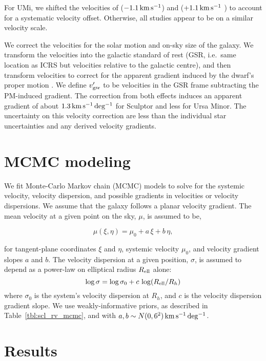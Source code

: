 For UMi, we shifted the velocities of \citet{spencer+2018}
(\(-1.1\,{\rm km\,s^{-1}}\)) and \citet{pace+2020} (\(+1.1\,{\rm km\,s^{-1}}\) ) to account for
a systematic velocity offset. Otherwise, all studies appear to be on a
similar velocity scale.

We correct the velocities for the solar motion and on-sky size of the
galaxy. We transform the velocities into the galactic standard of rest
(GSR, i.e.~same location as ICRS but velocities relative to the galactic
centre), and then transform velocities to correct for the apparent
gradient induced by the dwarf's proper motion \citep[see
also][]{WMO2008, strigari2010}. We define \(v_{\rm gsr}'\) to be
velocities in the GSR frame subtracting the PM-induced gradient. The
correction from both effects induces an apparent gradient of about
\(1.3\,{\rm km\,s^{-1}\,deg^{-1}}\) for Sculptor and less for Ursa Minor. The uncertainty
on this velocity correction are less than the individual star
uncertainties and any derived velocity gradients.

\section{MCMC modeling}\label{mcmc-modeling}

We fit Monte-Carlo Markov chain (MCMC) models to solve for the systemic
velocity, velocity dispersion, and possible gradients in velocities or
velocity dispersions. We assume that the galaxy follows a planar
velocity gradient. The mean velocity at a given point on the sky,
\(\mu\), is assumed to be,

\begin{equation}{
\mu(\xi, \eta) = \mu_0 + a\,\xi + b\,\eta,
}\end{equation}

for tangent-plane coordinates \(\xi\) and \(\eta\), systemic velocity
\(\mu_0\), and velocity gradient slopes \(a\) and \(b\). The velocity
dispersion at a given position, \(\sigma\), is assumed to depend as a
power-law on elliptical radius \(R_{\rm ell}\) alone: \begin{equation}{
\log \sigma = \log \sigma_0 + c\,\log(R_{\rm ell} / R_h)
}\end{equation} where \(\sigma_0\) is the system's velocity dispersion
at \(R_h\), and \(c\) is the velocity dispersion gradient slope. We use
weakly-informative priors, as described in Table~\ref{tbl:scl_rv_mcmc},
and with \(a, b \sim N(0, 6^2)\,{\rm km\,s^{-1}\,deg^{-1}}\).

\section{Results}\label{sec:rv_results}

